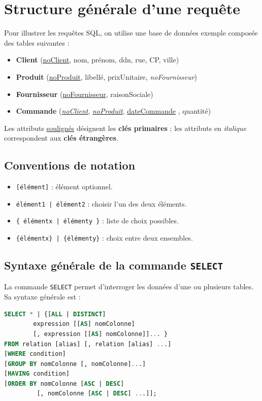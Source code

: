 \section{Structure générale d’une requête}

Pour illustrer les requêtes SQL, on utilise une base de données exemple composée des tables suivantes :

\begin{itemize}
    \item \textbf{Client} (\underline{noClient}, nom, prénom, ddn, rue, CP, ville)
    \item \textbf{Produit} (\underline{noProduit}, libellé, prixUnitaire, \textit{noFournisseur})
    \item \textbf{Fournisseur} (\underline{noFournisseur}, raisonSociale)
    \item \textbf{Commande} (\underline{\textit{noClient}}, \underline{\textit{noProduit}}, \underline{dateCommande} , quantité)
\end{itemize}

Les attributs \underline{soulignés} désignent les \textbf{clés primaires} ;  
les attributs en \textit{italique} correspondent aux \textbf{clés étrangères}.

\subsection*{Conventions de notation}

\begin{itemize}
    \item \texttt{[élément]} : élément optionnel.
    \item \texttt{élément1 | élément2} : choisir l’un des deux éléments.
    \item \texttt{\{ élémentx | élémenty \}} : liste de choix possibles.
    \item \texttt{\{élémentx\} | \{élémenty\}} : choix entre deux ensembles.
\end{itemize}

\subsection{Syntaxe générale de la commande \texttt{SELECT}}

La commande \texttt{SELECT} permet d’interroger les données d’une ou plusieurs tables. Sa syntaxe générale est :

\begin{sqlcodebox}
\begin{lstlisting}[language=SQL]
SELECT * | {[ALL | DISTINCT]
        expression [[AS] nomColonne]
        [, expression [[AS] nomColonne]]... } 
FROM relation [alias] [, relation [alias] ...]
[WHERE condition]
[GROUP BY nomColonne [, nomColonne]...]
[HAVING condition]
[ORDER BY nomColonne [ASC | DESC]
         [, nomColonne [ASC | DESC] ...]];
\end{lstlisting}
\end{sqlcodebox}

